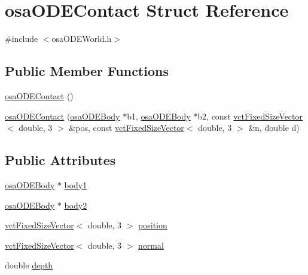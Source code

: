 \hypertarget{structosa_o_d_e_contact}{}\section{osa\+O\+D\+E\+Contact Struct Reference}
\label{structosa_o_d_e_contact}


{\ttfamily \#include $<$osa\+O\+D\+E\+World.\+h$>$}

\subsection*{Public Member Functions}
\begin{DoxyCompactItemize}
\item 
\hyperlink{structosa_o_d_e_contact_a496088c6e01a52a546a30cc356ac3b5d}{osa\+O\+D\+E\+Contact} ()
\item 
\hyperlink{structosa_o_d_e_contact_ae349ddb20efea33d4f382e4bc73dbfb5}{osa\+O\+D\+E\+Contact} (\hyperlink{classosa_o_d_e_body}{osa\+O\+D\+E\+Body} $\ast$b1, \hyperlink{classosa_o_d_e_body}{osa\+O\+D\+E\+Body} $\ast$b2, const \hyperlink{classvct_fixed_size_vector}{vct\+Fixed\+Size\+Vector}$<$ double, 3 $>$ \&pos, const \hyperlink{classvct_fixed_size_vector}{vct\+Fixed\+Size\+Vector}$<$ double, 3 $>$ \&n, double d)
\end{DoxyCompactItemize}
\subsection*{Public Attributes}
\begin{DoxyCompactItemize}
\item 
\hyperlink{classosa_o_d_e_body}{osa\+O\+D\+E\+Body} $\ast$ \hyperlink{structosa_o_d_e_contact_ae89beddf59923facc7abce1c1f9ce2a8}{body1}
\item 
\hyperlink{classosa_o_d_e_body}{osa\+O\+D\+E\+Body} $\ast$ \hyperlink{structosa_o_d_e_contact_a1148b4a03a82bf9f7155b4e7a7536739}{body2}
\item 
\hyperlink{classvct_fixed_size_vector}{vct\+Fixed\+Size\+Vector}$<$ double, 3 $>$ \hyperlink{structosa_o_d_e_contact_aec71f90b8053631cb8d51b2eb375a266}{position}
\item 
\hyperlink{classvct_fixed_size_vector}{vct\+Fixed\+Size\+Vector}$<$ double, 3 $>$ \hyperlink{structosa_o_d_e_contact_a13e7c6b7b860f7b0744121d413929807}{normal}
\item 
double \hyperlink{structosa_o_d_e_contact_a6c133096ca9fd520047a636656c50126}{depth}
\end{DoxyCompactItemize}


